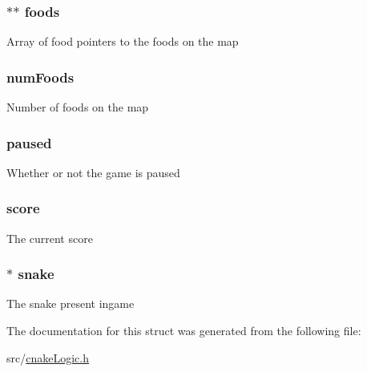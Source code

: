\subsubsection[{\texorpdfstring{foods}{foods}}]{$\ast$$\ast$ foods}\hypertarget{struct_game_aab913a1e81d59801882afbd45fa496d1}{}\label{struct_game_aab913a1e81d59801882afbd45fa496d1}
Array of food pointers to the foods on the map 
\subsubsection[{\texorpdfstring{num\+Foods}{numFoods}}]{ num\+Foods}\hypertarget{struct_game_a6eb06bc26a099c346c277fcaa4a1f30e}{}\label{struct_game_a6eb06bc26a099c346c277fcaa4a1f30e}
Number of foods on the map 
\subsubsection[{\texorpdfstring{paused}{paused}}]{ paused}\hypertarget{struct_game_a3ade7f893f61c2117f2ed3b49842cd64}{}\label{struct_game_a3ade7f893f61c2117f2ed3b49842cd64}
Whether or not the game is paused 
\subsubsection[{\texorpdfstring{score}{score}}]{ score}\hypertarget{struct_game_aa164f9e96d69917e222030f95185f844}{}\label{struct_game_aa164f9e96d69917e222030f95185f844}
The current score 
\subsubsection[{\texorpdfstring{snake}{snake}}]{$\ast$ snake}\hypertarget{struct_game_a408cd599ea288e5b692809edb69e65c2}{}\label{struct_game_a408cd599ea288e5b692809edb69e65c2}
The snake present ingame 

The documentation for this struct was generated from the following file\+:\begin{DoxyCompactItemize}
\item 
src/\hyperlink{cnake_logic_8h}{cnake\+Logic.\+h}\end{DoxyCompactItemize}

